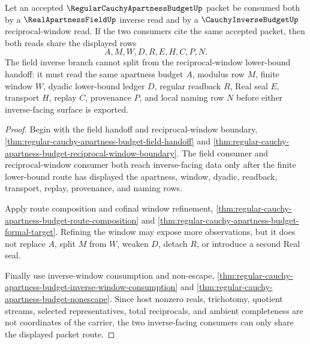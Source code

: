 \begin{theorem}
\label{thm:regular-cauchy-apartness-budget-shared-field-inverse-window}
Let an accepted $\RegularCauchyApartnessBudgetUp$ packet be consumed both by a $\RealApartnessFieldUp$ inverse read and by a $\CauchyInverseBudgetUp$ reciprocal-window read. If the two consumers cite the same accepted packet, then both reads share the displayed rows
$$
A,M,W,D,R,E,H,C,P,N .
$$
The field inverse branch cannot split from the reciprocal-window lower-bound handoff: it must read the same apartness budget $A$, modulus row $M$, finite window $W$, dyadic lower-bound ledger $D$, regular readback $R$, Real seal $E$, transport $H$, replay $C$, provenance $P$, and local naming row $N$ before either inverse-facing surface is exported.
\end{theorem}
\begin{proof}
Begin with the field handoff and reciprocal-window boundary, \autoref{thm:regular-cauchy-apartness-budget-field-handoff} and \autoref{thm:regular-cauchy-apartness-budget-reciprocal-window-boundary}. The field consumer and reciprocal-window consumer both reach inverse-facing data only after the finite lower-bound route has displayed the apartness, window, dyadic, readback, transport, replay, provenance, and naming rows.

Apply route composition and cofinal window refinement, \autoref{thm:regular-cauchy-apartness-budget-route-composition} and \autoref{thm:regular-cauchy-apartness-budget-formal-target}. Refining the window may expose more observations, but it does not replace $A$, split $M$ from $W$, weaken $D$, detach $R$, or introduce a second Real seal.

Finally use inverse-window consumption and non-escape, \autoref{thm:regular-cauchy-apartness-budget-inverse-window-consumption} and \autoref{thm:regular-cauchy-apartness-budget-nonescape}. Since host nonzero reals, trichotomy, quotient streams, selected representatives, total reciprocals, and ambient completeness are not coordinates of the carrier, the two inverse-facing consumers can only share the displayed packet route.
\end{proof}

